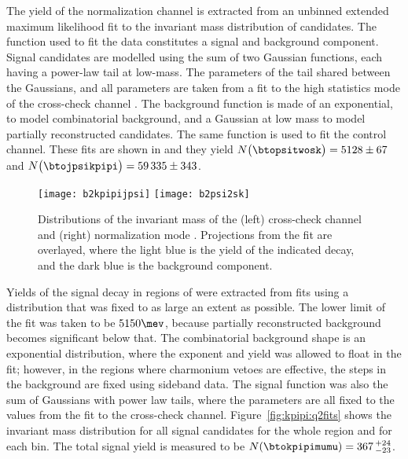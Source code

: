 The yield  of the normalization channel is extracted from an unbinned extended maximum likelihood
fit to the invariant mass distribution of \btopsitwosk candidates.
The function used to fit the data constitutes a signal and background component.
Signal candidates are modelled using the sum of two Gaussian functions, each having a power-law
tail at low-mass.
The parameters of the tail shared between the Gaussians, and all parameters are taken from a fit to
the high statistics mode of the cross-check channel \btojpsikpipi.
The background function is made of an exponential, to model combinatorial background, and a
Gaussian at low mass to model partially reconstructed candidates.
The same function is used to fit \mass{\jpsi\kpipi} the control channel.
These fits are shown in  and they yield
$N\big(\btopsitwosk\big)=5128\pm67$ and $N\big(\btojpsikpipi\big)=59\,335\pm343$.

\begin{figure}
  \begin{center}
    \texttt{[image: b2kpipijpsi]}
    \texttt{[image: b2psi2sk]}
    \caption[Fits to \btojpsikpipi and \btopsitwosk candidates]
    {\small
      Distributions of the invariant mass of the
      (left) cross-check channel \btojpsikpipi and
      (right) normalization mode \btopsitwosk.
      Projections from the fit are overlayed, where the light blue is the yield of the indicated
      decay, and the dark blue is the background component.
    }
    \label{fig:kpipi:norm}
  \end{center}
\end{figure}



Yields of the signal decay in regions of \qsq were extracted from fits using a distribution that
was fixed to as large an extent as possible.
The lower limit of the fit was taken to be $5150\mev$, because partially reconstructed background
becomes significant below that.
The combinatorial background shape is an exponential distribution, where the exponent and yield was
allowed to float in the fit; however, in the regions where charmonium vetoes are effective, the
steps in the background are fixed using sideband data.
The signal function was also the sum of Gaussians with power law tails, where the parameters are
all fixed to the values from the fit to the cross-check channel.
Figure~\ref{fig:kpipi:q2fits} shows the invariant mass distribution for all signal
candidates for the whole \qsq region and for each bin.
The total signal yield is measured to be $N(\btokpipimumu)=367\,^{+24}_{-23}$.


